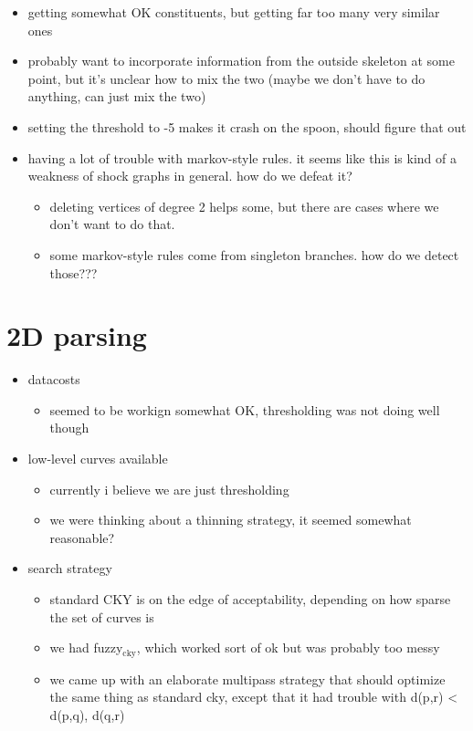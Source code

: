 \documentclass{book}
\begin{document}
\begin{itemize}
\item getting somewhat OK constituents, but getting far too many very
    similar ones
\item probably want to incorporate information from the outside skeleton
    at some point, but it's unclear how to mix the two (maybe we don't
    have to do anything, can just mix the two)
\item setting the threshold to -5 makes it crash on the spoon, should
    figure that out
\item having a lot of trouble with markov-style rules. it seems like
    this is kind of a weakness of shock graphs in general. how do we
    defeat it?

\begin{itemize}
\item deleting vertices of degree 2 helps some, but there are cases
      where we don't want to do that.
\item some markov-style rules come from singleton branches. how do we
      detect those???
\end{itemize}

\end{itemize}
\section{2D parsing}
\label{sec-4_2}

\begin{itemize}
\item datacosts

\begin{itemize}
\item seemed to be workign somewhat OK, thresholding was not doing well though
\end{itemize}

\item low-level curves available

\begin{itemize}
\item currently i believe we are just thresholding
\item we were thinking about a thinning strategy, it seemed somewhat reasonable?
\end{itemize}

\item search strategy

\begin{itemize}
\item standard CKY is on the edge of acceptability, depending on how
      sparse the set of curves is
\item we had fuzzy$_{\mathrm{cky}}$, which worked sort of ok but was probably too messy
\item we came up with an elaborate multipass strategy that should
      optimize the same thing as standard cky, except that it had
      trouble with d(p,r) < d(p,q), d(q,r)
\end{itemize}

\end{itemize}
\end{document}
